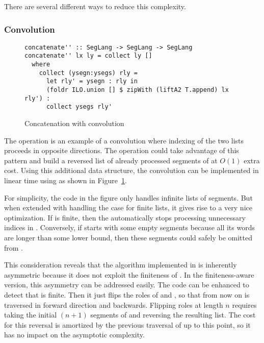 There are several different ways to reduce this complexity.

\subsubsection{Convolution}
\begin{figure}[tp]
\begin{lstlisting}
concatenate'' :: SegLang -> SegLang -> SegLang
concatenate'' lx ly = collect ly []
  where
    collect (ysegn:ysegs) rly =
      let rly' = ysegn : rly in
      (foldr ILO.union [] $ zipWith (liftA2 T.append) lx rly') :
      collect ysegs rly'
\end{lstlisting}
  \caption{Concatenation with convolution}
  \label{fig:concatenation-with-convolution}
\end{figure}
The  operation is an example of a convolution where
indexing of the two lists proceeds in opposite directions. The  operation
could take advantage of this pattern and build a reversed list  of already
processed segments of  at $O(1)$ extra cost. Using this additional data structure, the
convolution can be implemented in linear time using
 as shown in Figure~\ref{fig:concatenation-with-convolution}.

For simplicity, the code in the figure only handles infinite lists of
segments. But when extended with handling the case for finite lists,
it gives rise to a very nice optimization. If  is finite,
then the  automatically stops processing unnecessary indices in
. Conversely, if  starts with some empty segments
because all its words are longer than some lower bound, then these
segments could safely be omitted from .

This consideration reveals that the algorithm implemented in
 is inherently asymmetric because it does not
exploit the finiteness of . In the finiteness-aware version, this asymmetry can be
addressed easily.  The code can be
enhanced to detect that  is finite. Then it just flips the roles of
 and , so that from now on  is traversed in 
forward direction and  backwards. Flipping roles at length $n$ requires taking
the initial $(n+1)$ segments of  and reversing the resulting
list. The cost for this reversal is amortized by the previous traversal of
 up to this point, so it has no impact on the asymptotic
complexity.

